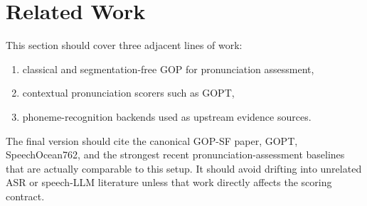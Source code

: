 \section{Related Work}

This section should cover three adjacent lines of work:

\begin{enumerate}
  \item classical and segmentation-free GOP for pronunciation assessment,
  \item contextual pronunciation scorers such as GOPT,
  \item phoneme-recognition backends used as upstream evidence sources.
\end{enumerate}

The final version should cite the canonical GOP-SF paper, GOPT, SpeechOcean762,
and the strongest recent pronunciation-assessment baselines that are actually
comparable to this setup. It should avoid drifting into unrelated ASR or
speech-LLM literature unless that work directly affects the scoring contract.
